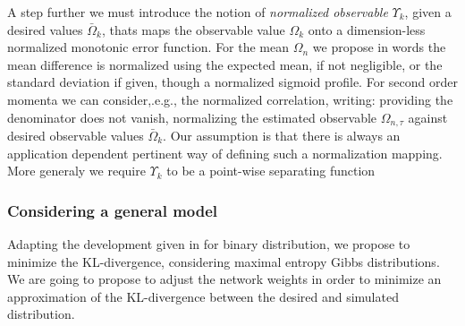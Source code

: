 A step further we must introduce the notion of {\em normalized observable} $\Upsilon_k$, given a desired values $\bar{\Omega}_{k}$, thats maps the observable value ${\Omega}_{k}$ onto a dimension-less normalized monotonic error function. For the mean ${\Omega}_{n}$ we propose
in words the mean difference is normalized using the expected mean, if not negligible, or the standard deviation if given, though a normalized sigmoid profile. For second order momenta we can consider,.e.g., the normalized correlation, writing:
providing the denominator does not vanish, normalizing the estimated observable ${\Omega}_{n,\tau}$ against desired observable values $\bar{\Omega}_k$. Our assumption is that there is always an application dependent pertinent way of defining such a normalization mapping. More generaly we require $\Upsilon_k$ to be a point-wise separating function

\subsubsection*{Considering a general model}

Adapting the development given in \cite{vasquez:inria-00574954} for binary distribution, we propose to minimize the KL-divergence, considering maximal entropy Gibbs distributions. We are going to propose to adjust the network weights in order to minimize an approximation of the KL-divergence between the desired and simulated distribution.

